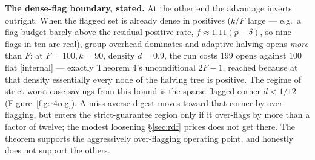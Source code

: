 \documentclass[11pt,a4paper]{article}
\begin{document}
\textbf{The dense-flag boundary, stated.} At the other end the advantage inverts outright. When the flagged set is already dense in positives ($k/F$ large --- e.g.\ a flag budget barely above the residual positive rate, $f\approx1.11(p-\delta)$, so nine flags in ten are real), group overhead dominates and adaptive halving opens \emph{more} than $F$: at $F{=}100,k{=}90$, density $d{=}0.9$, the run costs $199$ opens against $100$ flat [internal] --- exactly Theorem 4's unconditional $2F-1$, reached because at that density essentially every node of the halving tree is positive. The regime of strict worst-case savings from this bound is the sparse-flagged corner $d<1/12$ (Figure~\ref{fig:r4reg}). A miss-averse digest moves toward that corner by over-flagging, but enters the strict-guarantee region only if it over-flags by more than a factor of twelve; the modest loosening \S\ref{sec:rdf} prices does not get there. The theorem supports the aggressively over-flagging operating point, and honestly does not support the others.




\end{document}
